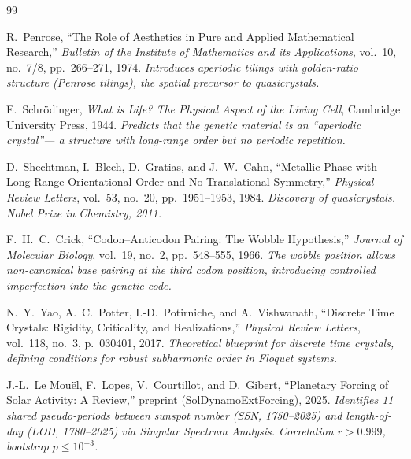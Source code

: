 \begin{thebibliography}{99}

R.~Penrose,
``The Role of Aesthetics in Pure and Applied Mathematical Research,''
\emph{Bulletin of the Institute of Mathematics and its Applications},
vol.~10, no.~7/8, pp.~266--271, 1974.
\textit{Introduces aperiodic tilings with golden-ratio structure (Penrose tilings),
the spatial precursor to quasicrystals.}

E.~Schr\"odinger,
\emph{What is Life? The Physical Aspect of the Living Cell},
Cambridge University Press, 1944.
\textit{Predicts that the genetic material is an ``aperiodic crystal''---
a structure with long-range order but no periodic repetition.}

D.~Shechtman, I.~Blech, D.~Gratias, and J.~W.~Cahn,
``Metallic Phase with Long-Range Orientational Order and No Translational Symmetry,''
\emph{Physical Review Letters}, vol.~53, no.~20, pp.~1951--1953, 1984.
\textit{Discovery of quasicrystals. Nobel Prize in Chemistry, 2011.}

F.~H.~C.~Crick,
``Codon--Anticodon Pairing: The Wobble Hypothesis,''
\emph{Journal of Molecular Biology}, vol.~19, no.~2, pp.~548--555, 1966.
\textit{The wobble position allows non-canonical base pairing at the third codon
position, introducing controlled imperfection into the genetic code.}

N.~Y.~Yao, A.~C.~Potter, I.-D.~Potirniche, and A.~Vishwanath,
``Discrete Time Crystals: Rigidity, Criticality, and Realizations,''
\emph{Physical Review Letters}, vol.~118, no.~3, p.~030401, 2017.
\textit{Theoretical blueprint for discrete time crystals, defining conditions
for robust subharmonic order in Floquet systems.}


J.-L.~Le Mou\"{e}l, F.~Lopes, V.~Courtillot, and D.~Gibert,
``Planetary Forcing of Solar Activity: A Review,''
preprint (SolDynamoExtForcing), 2025.
\textit{Identifies 11 shared pseudo-periods between sunspot number (SSN, 1750--2025)
and length-of-day (LOD, 1780--2025) via Singular Spectrum Analysis.
Correlation $r > 0.999$, bootstrap $p \leq 10^{-3}$.}


\end{thebibliography}
